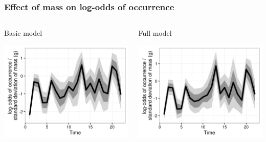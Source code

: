 \documentclass{beamer}
\begin{document}
\begin{frame}
  \frametitle{Effect of mass on log-odds of occurrence}

  \begin{columns}
    \begin{column}{0.5\textwidth}
      Basic model

      \includegraphics[height=\textheight,width=\textwidth,keepaspectratio=true]{figure/mass_eff_basic}
    \end{column}
    \begin{column}{0.5\textwidth}
      Full model

      \includegraphics[height=\textheight,width=\textwidth,keepaspectratio=true]{figure/mass_eff_full}
    \end{column}
  \end{columns}
\end{frame}
\end{document}
